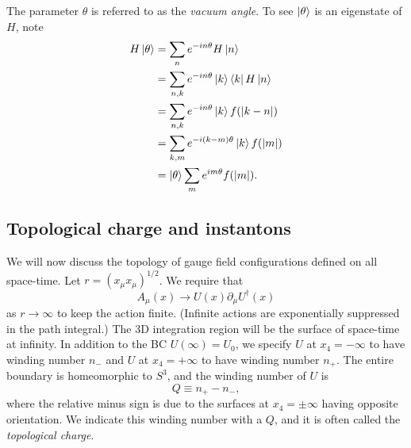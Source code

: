 The parameter $\theta$ is referred to as the {\it vacuum angle}. 
To see $\ket{\theta}$ is an eigenstate of $H$, note
\begin{equation}\begin{aligned}
H\ket{\theta}&=\sum_n e^{-in\theta}H\ket{n}\\
&=\sum_{n,k} e^{-in\theta}\ket{k}\bra{k}H\ket{n}\\
&=\sum_{n,k} e^{-in\theta}\ket{k}f(|k-n|)\\
&=\sum_{k,m} e^{-i(k-m)\theta}\ket{k}f(|m|)\\
&=\ket{\theta}\sum_{m} e^{im\theta}f(|m|).
\end{aligned}\end{equation}


\subsection{Topological charge and instantons}

We will now discuss the topology of gauge field
configurations defined on all space-time. Let $r=(x_\mu x_\mu)^{1/2}$.
We require that
\begin{equation}
  A_\mu(x)\to U(x)\partial_\mu U^\dagger(x)
\end{equation}
as $r\to\infty$ to keep the action finite. (Infinite actions are
exponentially suppressed in the path integral.) The 3D integration
region will be the surface of space-time at infinity.
In addition to the BC $U(\infty)=U_0$, we specify $U$ at $x_4=-\infty$
to have winding number $n_-$ and $U$ at $x_4=+\infty$ to have
winding number $n_+$. The entire boundary is homeomorphic to
$S^3$, and the winding number of $U$ is
\begin{equation}
  Q\equiv n_+-n_-, 
\end{equation}
where the relative minus sign is due to the surfaces at $x_4=\pm\infty$
having opposite orientation. We indicate this winding number with a
$Q$, and it is often called the {\it topological charge}.

